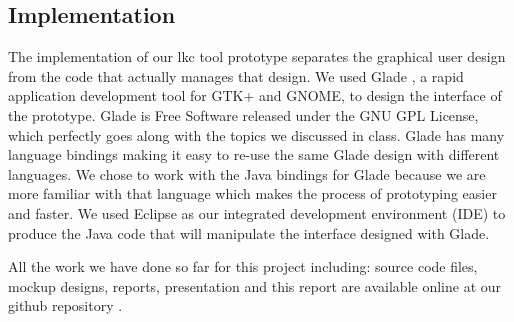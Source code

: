 \documentclass{chi2009}
\begin{document}
\subsection{Implementation}
The implementation of our \textsf{lkc} tool prototype separates the graphical user design from the code that actually manages that design. We used Glade
\cite{glade:2010}, a rapid application development tool for GTK+ and GNOME, to design the interface of the prototype. Glade is Free Software released under the
GNU GPL License, which perfectly goes along with the topics we discussed in class. Glade has many language bindings making it easy to re-use the same Glade
design with different languages. We chose to work with the Java bindings for Glade \cite{java-gnome:2010} because we are more familiar with that language which
makes the process of prototyping easier and faster. We used Eclipse \cite{eclipse:2010} as our integrated development environment (IDE) to produce the Java code
that will manipulate the interface designed with Glade.

All the work we have done so far for this project including: source code files, mockup designs, reports, presentation and this report are available online at
our github repository \cite{git-lkc:2010}.
\end{document}
